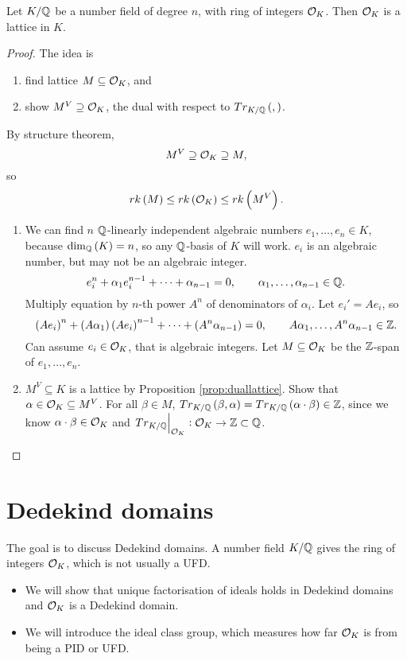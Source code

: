 \begin{theorem}
Let $ K / \mathbb{Q} $ be a number field of degree $ n $, with ring of integers $ \mathcal{O}_K $. Then $ \mathcal{O}_K $ is a lattice in $ K $.
\end{theorem}

\begin{proof}
The idea is
\begin{enumerate}
\item find lattice $ M \subseteq \mathcal{O}_K $, and
\item show $ M^V \supseteq \mathcal{O}_K $, the dual with respect to $ Tr_{K / \Q}\br{,} $.
\end{enumerate}
By structure theorem,
$$ M^V \supseteq \mathcal{O}_K \supseteq M, $$
so
$$ rk\br{M} \le rk\br{\OO_K} \le rk\br{M^V}. $$
\begin{enumerate}
\item We can find $ n $ $ \mathbb{Q} $-linearly independent algebraic numbers $ e_1, \dots, e_n \in K $, because $ \dim_\Q\br{K} = n $, so any $ \mathbb{Q} $-basis of $ K $ will work. $ e_i $ is an algebraic number, but may not be an algebraic integer.
$$ e_i^n + \alpha_1e_i^{n - 1} + \dots + \alpha_{n - 1} = 0, \qquad \alpha_1, \dots, \alpha_{n - 1} \in \mathbb{Q}. $$
Multiply equation by $ n $-th power $ A^n $ of denominators of $ \alpha_i $. Let $ e_i' = Ae_i $, so
$$ \br{Ae_i}^n + \br{A\alpha_1}\br{Ae_i}^{n - 1} + \dots + \br{A^n\alpha_{n - 1}} = 0, \qquad A\alpha_1, \dots, A^n\alpha_{n - 1} \in \Z. $$
Can assume $ e_i \in \mathcal{O}_K $, that is algebraic integers. Let $ M \subseteq \mathcal{O}_K $ be the $ \mathbb{Z} $-span of $ e_1, \dots, e_n $.
\item $ M^V \subseteq K $ is a lattice by Proposition \ref{prop:duallattice}. Show that $ \alpha \in \mathcal{O}_K \subseteq M^V $. For all $ \beta \in M $, $ Tr_{K / \Q}\br{\beta, \alpha} = Tr_{K / \Q}\br{\alpha \cdot \beta} \in \Z $, since we know $ \alpha \cdot \beta \in \mathcal{O}_K $ and $ \left. Tr_{K / \mathbb{Q}} \right|_{\mathcal{O}_K} : \mathcal{O}_K \to \mathbb{Z} \subset \mathbb{Q} $.
\end{enumerate}
\end{proof}

\pagebreak

\section{Dedekind domains}


The goal is to discuss Dedekind domains. A number field $ K / \mathbb{Q} $ gives the ring of integers $ \mathcal{O}_K $, which is not usually a UFD.
\begin{itemize}
\item We will show that unique factorisation of ideals holds in Dedekind domains and $ \mathcal{O}_K $ is a Dedekind domain.
\item We will introduce the ideal class group, which measures how far $ \mathcal{O}_K $ is from being a PID or UFD.
\end{itemize}

